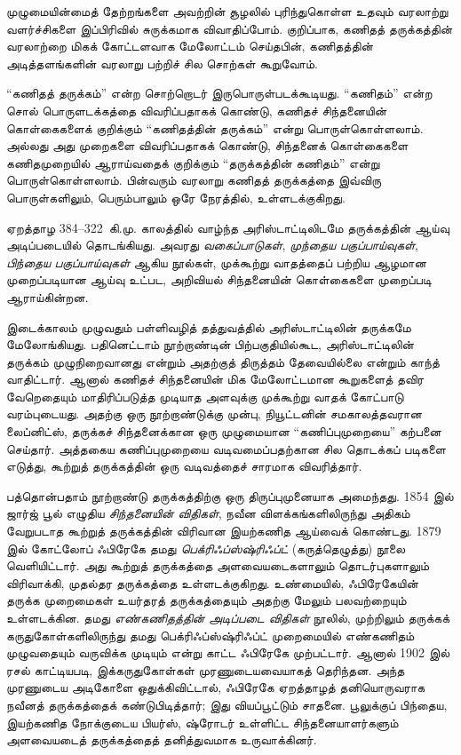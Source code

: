 \documentclass[../../../include/open-logic-section]{subfiles}
\begin{document}



முழுமையின்மைத் தேற்றங்களை அவற்றின் சூழலில் புரிந்துகொள்ள உதவும் வரலாற்று
வளர்ச்சிகளை இப்பிரிவில் சுருக்கமாக விவாதிப்போம். குறிப்பாக, கணிதத்
தருக்கத்தின் வரலாற்றை மிகக் கோட்டளவாக மேலோட்டம் செய்தபின், கணிதத்தின்
அடித்தளங்களின் வரலாறு பற்றிச் சில சொற்கள் கூறுவோம்.

\begin{digress}
  ``கணிதத் தருக்கம்'' என்ற சொற்றொடர் இருபொருள்படக்கூடியது. ``கணிதம்'' என்ற
சொல் பொருளடக்கத்தை விவரிப்பதாகக் கொண்டு, கணிதச் சிந்தனையின் கொள்கைகளைக்
குறிக்கும் ``கணிதத்தின் தருக்கம்'' என்று பொருள்கொள்ளலாம். அல்லது அது
முறைகளை விவரிப்பதாகக் கொண்டு, சிந்தனைக் கொள்கைகளை கணிதமுறையில் ஆராய்வதைக்
குறிக்கும் ``தருக்கத்தின் கணிதம்'' என்று பொருள்கொள்ளலாம். பின்வரும் வரலாறு
கணிதத் தருக்கத்தை இவ்விரு பொருள்களிலும், பெரும்பாலும் ஒரே நேரத்தில்,
உள்ளடக்குகிறது.
\end{digress}

ஏறத்தாழ 384--322~\textsc{கி.மு.} காலத்தில் வாழ்ந்த அரிஸ்டாட்டிலிடமே
தருக்கத்தின் ஆய்வு அடிப்படையில் தொடங்கியது. அவரது \emph{வகைப்பாடுகள்},
\emph{முந்தைய பகுப்பாய்வுகள்}, \emph{பிந்தைய பகுப்பாய்வுகள்} ஆகிய நூல்கள்,
முக்கூற்று வாதத்தைப் பற்றிய ஆழமான முறைப்படியான ஆய்வு உட்பட, அறிவியல்
சிந்தனையின் கொள்கைகளை முறைப்படி ஆராய்கின்றன.

இடைக்காலம் முழுவதும் பள்ளிவழித் தத்துவத்தில் அரிஸ்டாட்டிலின் தருக்கமே
மேலோங்கியது. பதினெட்டாம் நூற்றாண்டின் பிற்பகுதியில்கூட, அரிஸ்டாட்டிலின்
தருக்கம் முழுநிறைவானது என்றும் அதற்குத் திருத்தம் தேவையில்லை என்றும் காந்த்
வாதிட்டார். ஆனால் கணிதச் சிந்தனையின் மிக மேலோட்டமான கூறுகளைத் தவிர வேறெதையும்
மாதிரிப்படுத்த முடியாத அளவுக்கு முக்கூற்று வாதக் கோட்பாடு வரம்புடையது. அதற்கு
ஒரு நூற்றாண்டுக்கு முன்பு, நியூட்டனின் சமகாலத்தவரான லைப்னிட்ஸ், தருக்கச்
சிந்தனைக்கான ஒரு முழுமையான ``கணிப்புமுறையை'' கற்பனை செய்தார். அத்தகைய
கணிப்புமுறையை வடிவமைப்பதற்கான சில தொடக்கப் படிகளை எடுத்து, கூற்றுத்
தருக்கத்தின் ஒரு வடிவத்தைச் சாரமாக விவரித்தார்.

பத்தொன்பதாம் நூற்றாண்டு தருக்கத்திற்கு ஒரு திருப்புமுனையாக அமைந்தது. 1854
இல் ஜார்ஜ் பூல் எழுதிய \emph{சிந்தனையின் விதிகள்}, நவீன விளக்கங்களிலிருந்து
அதிகம் வேறுபடாத கூற்றுத் தருக்கத்தின் விரிவான இயற்கணித ஆய்வைக் கொண்டது.
1879 இல் கோட்லோப் ஃபிரேகே தமது \emph{பெக்ரிஃப்ஸ்ஷ்ரிஃப்ட்}
(கருத்தெழுத்து) நூலை வெளியிட்டார். அது கூற்றுத் தருக்கத்தை அளவையடைகளாலும்
தொடர்புகளாலும் விரிவாக்கி, முதல்தர தருக்கத்தை உள்ளடக்குகிறது. உண்மையில்,
ஃபிரேகேயின் தருக்க முறைமைகள் உயர்தரத் தருக்கத்தையும் அதற்கு மேலும் பலவற்றையும்
உள்ளடக்கின. தமது \emph{எண்கணிதத்தின் அடிப்படை விதிகள்} நூலில், முற்றிலும்
தருக்கக் கருதுகோள்களிலிருந்து தமது பெக்ரிஃப்ஸ்ஷ்ரிஃப்ட் முறைமையில் எண்கணிதம்
முழுவதையும் வருவிக்க முடியும் என்று காட்ட ஃபிரேகே முற்பட்டார். ஆனால் 1902
இல் ரசல் காட்டியபடி, இக்கருதுகோள்கள் முரணுடையவையாகத் தெரிந்தன. அந்த
முரணுடைய அடிகோளை ஒதுக்கிவிட்டால், ஃபிரேகே ஏறத்தாழத் தனியொருவராக நவீனத்
தருக்கத்தைக் கண்டுபிடித்தார்; இது வியப்பூட்டும் சாதனை. பூலுக்குப் பிந்தைய,
இயற்கணித நோக்குடைய பியர்ஸ், ஷ்ரோடர் உள்ளிட்ட சிந்தனையாளர்களும் அளவையடைத்
தருக்கத்தைத் தனித்துவமாக உருவாக்கினர்.
\end{document}
